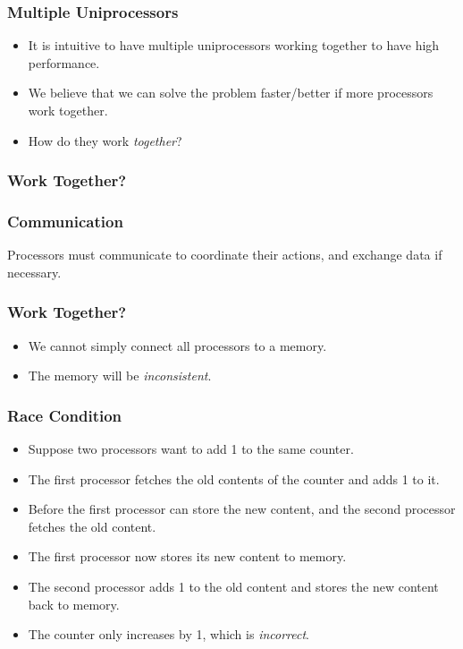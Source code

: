 \documentclass{beamer}
\begin{document}
\begin{CJK}{UTF8}{bsmi}
\begin{frame}
\frametitle{Multiple Uniprocessors}
\begin{itemize}
\item It is intuitive to have multiple uniprocessors working together to have high performance.
\item We believe that we can solve the problem faster/better if more processors work together.
\item How do they work {\em together}?
\end{itemize}
\end{frame}

\begin{frame}
\frametitle{Work Together?}
\centerline{}
\end{frame}

\begin{frame}
\frametitle{Communication} 
\huge Processors must communicate to
coordinate their actions, and exchange data if necessary.
\end{frame}


\begin{frame}
\frametitle{Work Together?}
\centerline{}
\begin{itemize}
\item We cannot simply connect all processors to a memory.
\item The memory will be {\em inconsistent}.
\end{itemize}
\end{frame}

\begin{frame}
\frametitle{Race Condition}
\begin{itemize}
\item Suppose two processors want to add 1 to the same counter.
\item The first processor fetches the old contents of the counter and adds 1 to it.
\item Before the first processor can store the new content, and the second processor fetches the old content.
\item The first processor now stores its new content to memory.
\item The second processor adds 1 to the old content and stores the new content back to memory.
\item The counter only increases by 1, which is {\em incorrect}.
\end{itemize}
\end{frame}



\end{CJK}
\end{document}
